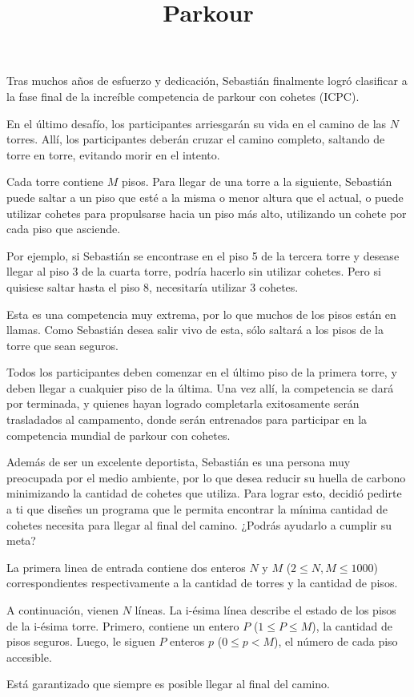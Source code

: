 \documentclass{oci}
\title{Parkour}
\begin{document}
\begin{problemDescription}
  Tras muchos años de esfuerzo y dedicación, Sebastián finalmente logró clasificar a la fase final de la increíble competencia de parkour con cohetes (ICPC).

  En el último desafío, los participantes arriesgarán su vida en el camino de las $N$ torres. Allí, los participantes deberán cruzar el camino completo, saltando de torre en torre, evitando morir en el intento.

  Cada torre contiene $M$ pisos. Para llegar de una torre a la siguiente, Sebastián puede saltar a un piso que esté a la misma o menor altura que el actual, o puede utilizar cohetes para propulsarse hacia un piso más alto, utilizando un cohete por cada piso que asciende.

  Por ejemplo, si Sebastián se encontrase en el piso 5 de la tercera torre y desease llegar al piso 3 de la cuarta torre, podría hacerlo sin utilizar cohetes. Pero si quisiese saltar hasta el piso 8, necesitaría utilizar 3 cohetes.

  Esta es una competencia muy extrema, por lo que muchos de los pisos están en llamas. Como Sebastián desea salir vivo de esta, sólo saltará a los pisos de la torre que sean seguros.

  Todos los participantes deben comenzar en el último piso de la primera torre, y deben llegar a cualquier piso de la última. Una vez allí, la competencia se dará por terminada, y quienes hayan logrado completarla exitosamente serán trasladados al campamento, donde serán entrenados para participar en la competencia mundial de parkour con cohetes.

  Además de ser un excelente deportista, Sebastián es una persona muy preocupada por el medio ambiente, por lo que desea reducir su huella de carbono minimizando la cantidad de cohetes que utiliza. Para lograr esto, decidió pedirte a ti que diseñes un programa que le permita encontrar la mínima cantidad de cohetes necesita para llegar al final del camino. ¿Podrás ayudarlo a cumplir su meta?

\end{problemDescription}

\begin{inputDescription}
  La primera linea de entrada contiene dos enteros $N$ y $M$ ($2 \leq N, M \leq 1000$) correspondientes respectivamente a la cantidad de torres y la cantidad de pisos.

  A continuación, vienen $N$ líneas. La i-ésima línea describe el estado de los pisos de la i-ésima torre. Primero, contiene un entero $P$ ($1 \leq P \leq M$), la cantidad de pisos seguros. Luego, le siguen $P$ enteros $p$ ($0 \leq p < M$), el número de cada piso accesible.

  Está garantizado que siempre es posible llegar al final del camino.
\end{inputDescription}
\end{document}

